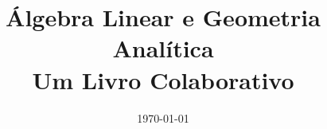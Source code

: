 \documentclass[twoside,11pt]{book}
\title{Álgebra Linear e Geometria Analítica\\\small{Um Livro Colaborativo}}
\date{\today}
\author{}
\theoremstyle{plain}  %
\theoremstyle{remark}  %
\theoremstyle{definition}  %
\newcommand\summaryname{abstract}
\newenvironment{abstract}%
    {\small\begin{center}%
    \bfseries{\summaryname} \end{center}}
\begin{document}
\iflatexml
\begin{abstract}
  Este livro busca abordar os tópicos de um curso moderno de álgebra linear e geometria analítica em conjunto. Dá-se prioridade a uma abordagem intuitiva, com exemplos e exercícios que ilustrem os conceitos.
\end{abstract}
\fi


\maketitle

\mainmatter






\iflatexml

\begin{lxFooter}
  Licença CC BY-SA 3.0 http://creativecommons.org/licenses/by-sa/3.0/
\end{lxFooter}
\fi

\mainmatter
 


\clearpage
\appendix
%

\iflatexml
\else
 
\fi


\nocite{*}





\backmatter

\printindex
\end{document}
